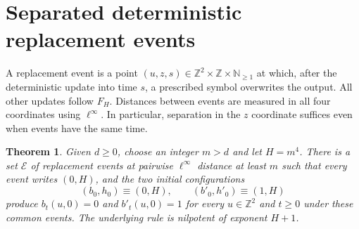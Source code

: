 \documentclass[11pt]{article}
\theoremstyle{plain}
\newtheorem{theorem}{Theorem}[section]
\theoremstyle{definition}
\theoremstyle{remark}
\newcommand{\Z}{\mathbb Z}
\newcommand{\N}{\mathbb N}
\begin{document}
\section{Separated deterministic replacement events}\label{sec:deterministic}

A replacement event is a point $(u,z,s)\in\Z^2\times\Z\times\N_{\geq1}$ at which, after the deterministic update into time $s$, a prescribed symbol overwrites the output. All other updates follow $F_H$. Distances between events are measured in all four coordinates using $\ell^\infty$. In particular, separation in the $z$ coordinate suffices even when events have the same time.

\begin{theorem}\label{thm:separation}
Given $d\geq0$, choose an integer $m>d$ and let $H=m^4$. There is a set $\mathcal E$ of replacement events at pairwise $\ell^\infty$ distance at least $m$ such that every event writes $(0,H)$, and the two initial configurations
\[
 (b_0,h_0)\equiv(0,H),\qquad (b'_0,h'_0)\equiv(1,H)
\]
produce $b_t(u,0)=0$ and $b'_t(u,0)=1$ for every $u\in\Z^2$ and $t\geq0$ under these common events. The underlying rule is nilpotent of exponent $H+1$.
\end{theorem}
\end{document}
